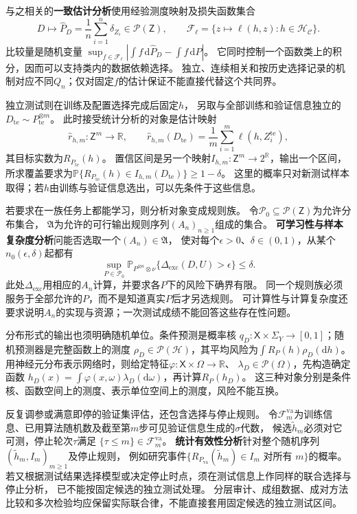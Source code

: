 与之相关的\textbf{一致估计分析}使用经验测度映射及损失函数集合
\[
  D\mapsto\widehat P_D=\frac1n\sum_{i=1}^n\delta_{Z_i}
     \in\mathcal P(\mathsf Z),\qquad
  \mathcal F_\ell=\{z\mapsto\ell(h,z):h\in\mathcal H_{\mathcal C}\}.
\]
比较量是随机变量
$\sup_{f\in\mathcal F_\ell}|\int f\,\mathrm d\widehat P_D-\int f\,\mathrm dP|$。
它同时控制一个函数类上的积分，因而可以支持类内的数据依赖选择。
独立、连续相关和按历史选择记录的机制对应不同$Q_n$；仅对固定$f$的估计保证不能直接代替这个共同界。

独立测试则在训练及配置选择完成后固定$h$，
另取与全部训练和验证信息独立的$D_{\mathrm{te}}\sim P_{\mathrm{te}}^{\otimes m}$。
此时接受统计分析的对象是估计映射
\[
  \widehat r_{h,m}:\mathsf Z^m\to\mathbb R,
  \qquad \widehat r_{h,m}(D_{\mathrm{te}})
       =\frac1m\sum_{i=1}^m\ell(h,Z_i^{\mathrm{te}}),
\]
其目标实数为$R_{P_{\mathrm{te}}}(h)$。
置信区间是另一个映射$I_{h,m}:\mathsf Z^m\to2^{\mathbb R}$，输出一个区间，
所求覆盖要求为$\mathbb P\{R_{P_{\mathrm{te}}}(h)\in I_{h,m}(D_{\mathrm{te}})\}\geq1-\delta$。
这里的概率只对新测试样本取得；若$h$由训练与验证信息选出，可以先条件于这些信息。

若要求在一族任务上都能学习，则分析对象变成规则族。
令$\mathcal P_0\subseteq\mathcal P(\mathsf Z)$为允许分布集合，
$\mathfrak A$为允许的可行输出规则序列$(A_n)_{n\geq1}$组成的集合。
\textbf{可学习性与样本复杂度分析}问能否选取一个$(A_n)\in\mathfrak A$，
使对每个$\epsilon>0$、$\delta\in(0,1)$，从某个$n_0(\epsilon,\delta)$起都有
\[
  \sup_{P\in\mathcal P_0}
  \mathbb P_{P^{\otimes n}\otimes\nu}
       \{\Delta_{\mathrm{exc}}(D,U)>\epsilon\}\leq\delta.
\]
此处$\Delta_{\mathrm{exc}}$用相应的$A_n$计算，并要求各$P$下的风险下确界有限。
同一个规则族必须服务于全部允许的$P$，而不是知道真实$P$后才另选规则。
可计算性与计算复杂度还要求说明$A_n$的实现与资源；一次测试成绩不能回答这些存在性问题。

分布形式的输出也须明确随机单位。条件预测是概率核
$q_D:\mathsf X\times\Sigma_Y\to[0,1]$；随机预测器是完整函数上的测度
$\rho_D\in\mathcal P(\mathcal H)$，其平均风险为$\int R_P(h)\rho_D(\mathrm dh)$。
用神经元分布表示网络时，则给定特征$\varphi:\mathsf X\times\Omega\to\mathbb R$、
$\lambda_D\in\mathcal P(\Omega)$，先构造确定函数
$h_D(x)=\int\varphi(x,\omega)\lambda_D(\mathrm d\omega)$，再计算$R_P(h_D)$。
这三种对象分别是条件核、函数空间上的测度、表示单位空间上的测度，风险不能互换。

反复调参或满意即停的验证集评估，还包含选择与停止规则。
令$\mathcal F_m^{\mathrm{va}}$为训练信息、已用算法随机数及截至第$m$步可见验证信息生成的$\sigma$代数，
候选$\widetilde h_m$必须对它可测，停止轮次$\tau$满足
$\{\tau\leq m\}\in\mathcal F_m^{\mathrm{va}}$。
\textbf{统计有效性分析}针对整个随机序列$(\widetilde h_m,I_m)_{m\geq1}$及停止规则，
例如研究事件$\{R_{P_{\mathrm{va}}}(\widetilde h_m)\in I_m\text{ 对所有 }m\}$的概率。
若又根据测试结果选择模型或决定停止时点，须在测试信息上作同样的联合选择与停止分析，
已不能按固定候选的独立测试处理。
分层审计、成组数据、成对方法比较和多次检验均应保留实际联合律，不能直接套用固定候选的独立测试区间。

